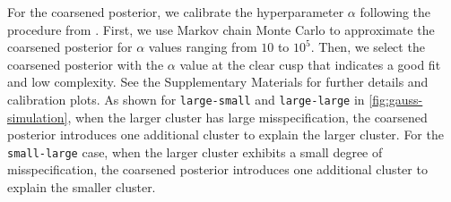 For the coarsened posterior, we calibrate the hyperparameter $\alpha$ following the procedure from \citet[Section 4]{Miller:2019}.
First, we use Markov chain Monte Carlo to approximate the coarsened posterior for $\alpha$ values ranging from $10$ to $10^5$.
Then, we select the coarsened posterior with the $\alpha$ value at the clear cusp that indicates a good fit and low complexity.
See the Supplementary Materials for further details and calibration plots.
As shown for \texttt{large-small} and \texttt{large-large} in \cref{fig:gauss-simulation}, when the
larger cluster has large misspecification, the coarsened posterior introduces one additional cluster to explain the larger cluster.
For the \texttt{small-large} case, when the larger cluster exhibits a small degree of misspecification,
the coarsened posterior introduces one additional cluster to explain the smaller cluster.


